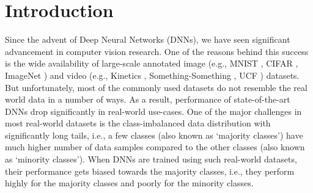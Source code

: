 \documentclass[runningheads]{llncs}
\begin{document}
\section{Introduction}
\label{intro}

Since the advent of Deep Neural Networks (DNNs), we have seen significant 
advancement in computer vision research. One of the reasons behind this success 
is
the wide availability of large-scale annotated image (e.g., MNIST \cite{MNIST_data}, CIFAR 
\cite{CIFAR}, ImageNet \cite{Imagenet}) and video (e.g., Kinetics \cite{Kinetics}, Something-Something \cite{Something-something}, UCF \cite{UCF}) datasets.
But unfortunately, most of the commonly used datasets do not resemble the 
real world data in a number of ways. As a result, performance of state-of-the-art
DNNs drop significantly in real-world use-cases. One of the major challenges in 
most
real-world datasets is the class-imbalanced data distribution with significantly 
long
tails, i.e., a few classes (also known as ‘majority classes’) have much higher 
number
of data samples compared to the other classes (also known as ‘minority 
classes’).
When DNNs are trained using such real-world datasets, their performance gets 
biased towards the majority classes, i.e., they perform highly for the majority 
classes
and poorly for the minority classes.
\end{document}
